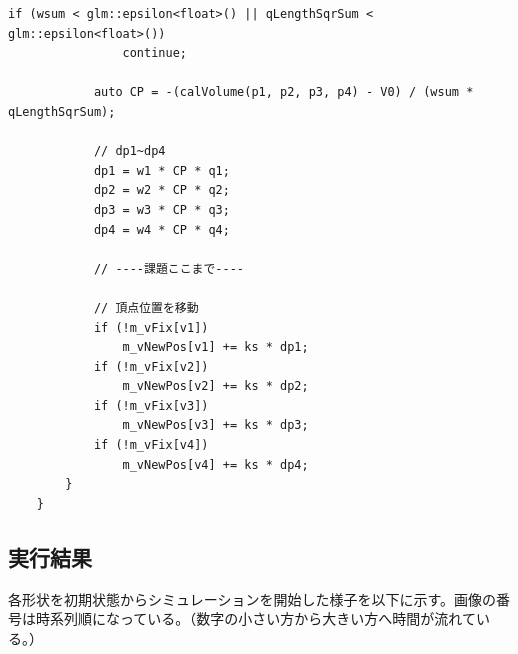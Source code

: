 \documentclass[a4paper,10pt,uplatex,dvipdfmx]{jsarticle}
\begin{document}
\begin{lstlisting}[caption=pbd.cppのprojectVolumeConstraint関数]
			if (wsum < glm::epsilon<float>() || qLengthSqrSum < glm::epsilon<float>())
				continue;
	
			auto CP = -(calVolume(p1, p2, p3, p4) - V0) / (wsum * qLengthSqrSum);
	
			// dp1~dp4
			dp1 = w1 * CP * q1;
			dp2 = w2 * CP * q2;
			dp3 = w3 * CP * q3;
			dp4 = w4 * CP * q4;
	
			// ----課題ここまで----
	
			// 頂点位置を移動
			if (!m_vFix[v1])
				m_vNewPos[v1] += ks * dp1;
			if (!m_vFix[v2])
				m_vNewPos[v2] += ks * dp2;
			if (!m_vFix[v3])
				m_vNewPos[v3] += ks * dp3;
			if (!m_vFix[v4])
				m_vNewPos[v4] += ks * dp4;
		}
	}
\end{lstlisting}

\subsection{実行結果}
各形状を初期状態からシミュレーションを開始した様子を以下に示す。画像の番号は時系列順になっている。（数字の小さい方から大きい方へ時間が流れている。）
\end{document}
